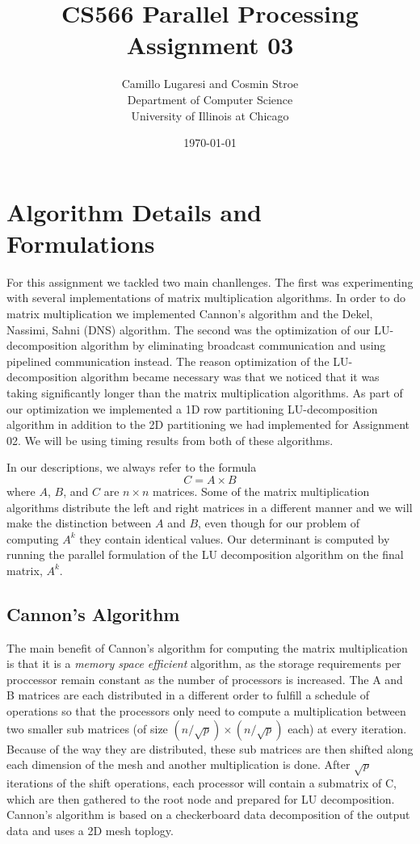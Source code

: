 \documentclass{article}
\title{CS566 Parallel Processing \\ Assignment 03}
\author{Camillo Lugaresi and Cosmin Stroe \vspace{20pt} \\ Department of Computer Science \\
University of Illinois at Chicago}
\date{\today}
\begin{document}
\maketitle
\newpage

\section{Algorithm Details and Formulations}

For this assignment we tackled two main chanllenges.  The first was
experimenting with several implementations of matrix multiplication algorithms. 
In order to do matrix multiplication we implemented Cannon's algorithm and the
Dekel, Nassimi, Sahni (DNS) algorithm.  The second was the optimization of our
LU-decomposition algorithm by eliminating broadcast communication and using
pipelined communication instead.  The reason optimization of the
LU-decomposition algorithm became necessary was that we noticed that it was
taking significantly longer than the matrix multiplication algorithms.  As part
of our optimization we implemented a 1D row partitioning LU-decomposition
algorithm in addition to the 2D partitioning we had implemented for
Assignment 02.  We will be using timing results from both of these algorithms.

In our descriptions, we always refer to the formula $$C = A \times B$$ where
$A$, $B$, and $C$ are $n \times n$ matrices.  Some of the matrix multiplication
algorithms distribute the left and right matrices in a different manner and we
will make the distinction between $A$ and $B$, even though for our problem of
computing $A^k$ they contain identical values.  Our determinant is computed by
running the parallel formulation of the LU decomposition algorithm on the final
matrix, $A^k$.



\subsection{Cannon's Algorithm}

The main benefit of Cannon's algorithm for computing the matrix multiplication
is that it is a \textit{memory space efficient} algorithm, as the storage
requirements per proccessor remain constant as the number of processors is
increased.  The A and B matrices are each distributed in a different order to
fulfill a schedule of operations so that the processors only need to compute a multiplication
between two smaller sub matrices (of size $(n/\sqrt{p})\times(n/\sqrt{p})$ each) at every iteration.  
Because of the way they are distributed, these sub matrices are then shifted
along each dimension of the mesh and another multiplication is done. After
$\sqrt{p}$ iterations of the shift operations, each processor will contain a
submatrix of C, which are then gathered to the root node and prepared for LU
decomposition.  Cannon's algorithm is based on a checkerboard data
decomposition of the output data and uses a 2D mesh toplogy.
\end{document}
